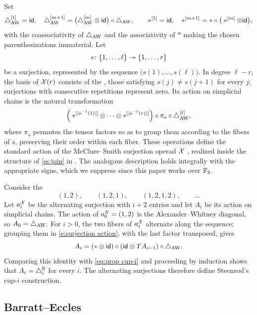 Set
\[
\triangle_{{\mathrm{AW}}}^{[1]} = \mathsf{id}, \quad
\triangle_{{\mathrm{AW}}}^{[m+1]} = \big(\triangle_{{\mathrm{AW}}}^{[m]} \otimes \mathsf{id}\big) \circ \triangle_{{\mathrm{AW}}},
\qquad
\ast^{[1]} = \mathsf{id}, \quad
\ast^{[m+1]} = \ast \circ \big(\ast^{[m]} \otimes \mathsf{id}\big),
\]
with the coassociativity of $\triangle_{{\mathrm{AW}}}$ and the associativity of $\ast$ making the chosen parenthesizations immaterial.
Let
\[
s \colon \{1, \dots, \ell\} \twoheadrightarrow \{1, \dots, r\}
\]
be a surjection, represented by the sequence $\big(s(1), \dots, s(\ell)\big)$.
In degree $\ell-r$, the basis of $\mathcal{X}(r)$ consists of the , those satisfying $s(j) \neq s(j+1)$ for every $j$; surjections with consecutive repetitions represent zero.
Its action on simplicial chains is the natural transformation
\begin{equation}\label{e:surjection action}
	\Big(\ast^{[\lvert s^{-1}(1)\rvert]} \otimes \dotsb \otimes \ast^{[\lvert s^{-1}(r)\rvert]}\Big)
	\circ \pi_s \circ \triangle_{{\mathrm{AW}}}^{[\ell]},
\end{equation}
where $\pi_s$ permutes the tensor factors so as to group them according to the fibers of $s$, preserving their order within each fiber.
These operations define the standard action of the McClure--Smith surjection operad $\mathcal{X}$ \cite{mcclure2003multivariable}, realized inside the structure of \cref{ss:join} in \cite[Appendix~1]{medina2020prop1}.
The analogous description holds integrally with the appropriate signs, which we suppress since this paper works over \({\mathbb{F}_2}\).

Consider the 
\[
(1,2), \qquad (1,2,1), \qquad (1,2,1,2), \qquad \dots
\]
Let $a_i^{\mathcal{X}}$ be the alternating surjection with $i+2$ entries and let $A_i$ be its action on simplicial chains.
The action of $a_0^{\mathcal{X}} = (1,2)$ is the Alexander--Whitney diagonal, so $A_0 = \triangle_{{\mathrm{AW}}}$.
For $i>0$, the two fibers of $a_i^{\mathcal{X}}$ alternate along the sequence; grouping them in \cref{e:surjection action}, with the last factor transposed, gives
\[
A_i = (\ast \otimes \mathsf{id}) \circ (\mathsf{id} \otimes T A_{i-1}) \circ \triangle_{{\mathrm{AW}}}.
\]
Comparing this identity with \cref{eq:prop cup-i} and proceeding by induction shows that $A_i = \triangle^{\mathrm{S}}_i$ for every $i$.
The alternating surjections therefore define Steenrod's \mbox{cup-$i$} construction.

\subsection{Barratt--Eccles}\label{ss:barratt_eccles}

